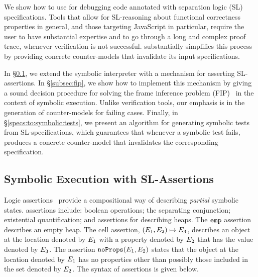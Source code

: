 
We show how to use \cosette for debugging \jsil code annotated with 
separation logic (SL) specifications. Tools that allow for SL-reasoning about
functional correctness properties in general, and those targeting 
JavaScript in particular, require the user to have substantial expertise 
and to go through a long and complex proof trace, whenever verification
is not successful. \cosette substantially simplifies this process by providing
concrete counter-models that invalidate its input specifications.

In \S\ref{subsec:sep:assertions}, we extend the 
 \jsil symbolic interpreter with a mechanism for asserting
SL-assertions. 
%
In \S\ref{subsec:fip}, we show how to implement this mechanism by giving 
a sound decision procedure for solving the frame inference problem (FIP)~\cite{}
in the context of symbolic execution.
%
Unlike verification tools, our emphasis is in the generation of counter-models 
for failing cases. 
%
Finally, in \S\ref{specs:to:symbolic:tests}, we present an algorithm  
for generating symbolic tests from SL-specifications, which guarantees 
that whenever a symbolic test fails, \cosette produces a concrete 
counter-model that invalidates the corresponding specification.

\subsection{Symbolic Execution with SL-Assertions}\label{subsec:sep:assertions}

\jsil Logic assertions~\cite{javert}
provide a compositional way of describing \emph{partial} symbolic states. 
\jsil assertions include: boolean operations; the separating conjunction; 
existential quantification; and assertions for describing heaps. The $\texttt{emp}$ assertion describes 
an empty heap. The cell assertion, $(E_1,E_2) \mapsto E_3$,  describes an object 
at the location denoted by $E_1$ with a property denoted by $E_2$ that has the value 
denoted by $E_3$. The assertion $\texttt{noProps}(E_1, E_2)$ states that the object at 
the location denoted by $E_1$ has no properties other than possibly those included in the
set denoted by $E_2$. The syntax of assertions is given below. 

